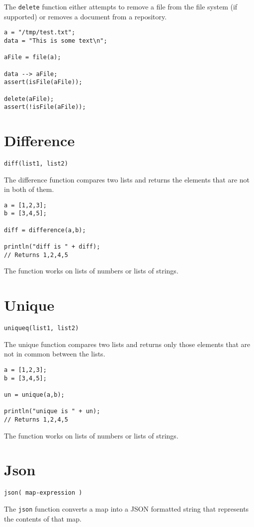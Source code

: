 The \Verb+delete+ function either attempts to remove a file from the file system (if supported) or removes a document from a repository.
\begin{lstlisting}[caption={Delete example}]
a = "/tmp/test.txt";
data = "This is some text\n";

aFile = file(a);

data --> aFile;
assert(isFile(aFile));

delete(aFile);
assert(!isFile(aFile));

\end{lstlisting}
\section{Difference}
\begin{Verbatim}
diff(list1, list2)
\end{Verbatim}
The difference function compares two lists and returns the elements that are not in both of them.
\begin{lstlisting}[caption={Difference example}]
a = [1,2,3];
b = [3,4,5];

diff = difference(a,b);

println("diff is " + diff);
// Returns 1,2,4,5
\end{lstlisting}
The function works on lists of numbers or lists of strings.
\section{Unique}
\begin{Verbatim}
uniqueq(list1, list2)
\end{Verbatim}
The unique function compares two lists and returns only those elements that are not in common between the lists.
\begin{lstlisting}[caption={Unique example}]
a = [1,2,3];
b = [3,4,5];

un = unique(a,b);

println("unique is " + un);
// Returns 1,2,4,5
\end{lstlisting}
The function works on lists of numbers or lists of strings.
\section{Json}
\begin{Verbatim}
json( map-expression )
\end{Verbatim}

The \Verb+json+ function converts a map into a JSON formatted string that represents the contents of that map.


